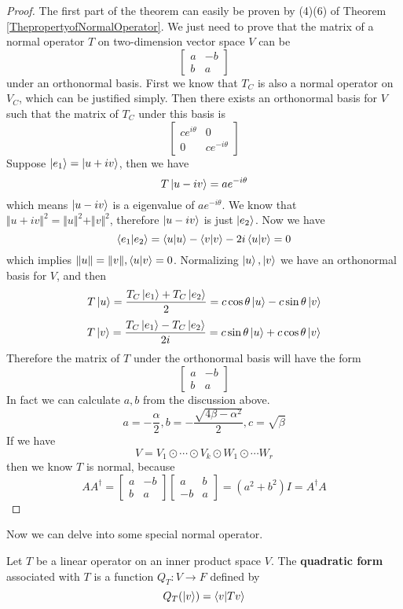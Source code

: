 \documentclass{article}
\begin{document}
\begin{proof}
	The first part of the theorem can easily be proven by (4)(6) of Theorem \ref{ThepropertyofNormalOperator}. We just need to prove that the matrix of a normal operator $T$ on two-dimension vector space $V$ can be
	\[\begin{bmatrix}
		a&-b\\
		b&a
	\end{bmatrix}\]
	under an orthonormal basis. First we know that $T_C$ is also a normal operator on $V_C$, which can be justified simply. Then there exists an orthonormal basis for $V$ such that the matrix of $T_C$ under this basis is
	\[\begin{bmatrix}
		ce^{i\theta}&0\\
		0&ce^{-i\theta}
	\end{bmatrix}\]
	Suppose $\ket{e_1}=\ket{u+iv}$, then we have
	\[T\ket{u-iv}=ae^{-i\theta}\]
	which means $\ket{u-iv}$ is a eigenvalue of $ae^{-i\theta}$. We know that $\Vert u+iv\Vert^2=\Vert u\Vert^2+\Vert v\Vert^2$, therefore $\ket{u-iv}$ is just $\ket{e_2}$. Now we have
	\[\braket{e_1|e_2}=\braket{u|u}-\braket{v|v}-2i\braket{u|v}=0\]
	which implies $\Vert u\Vert=\Vert v\Vert,\braket{u|v}=0$. Normalizing $\ket{u},\ket{v}$ we have an orthonormal basis for $V$, and then
	\[T\ket{u}=\frac{T_C\ket{e_1}+T_C\ket{e_2}}{2}=c\cos\theta\ket{u}-c\sin\theta\ket{v}\]
	\[T\ket{v}=\frac{T_C\ket{e_1}-T_C\ket{e_2}}{2i}=c\sin\theta\ket{u}+c\cos\theta\ket{v}\]
	Therefore the matrix of $T$ under the orthonormal basis will have the form
	\[\begin{bmatrix}
		a&-b\\
		b&a
	\end{bmatrix}\]
	In fact we can calculate $a,b$ from the discussion above.
	\[a=-\frac{\alpha}{2},b=-\frac{\sqrt{4\beta-\alpha^2}}{2},c=\sqrt{\beta}\]
	If we have
	\[V=V_1\odot\cdots\odot V_k\odot W_1\odot\cdots W_r\]
	then we know $T$ is normal, because
	\[AA^\dagger=\begin{bmatrix}
		a&-b\\
		b&a
	\end{bmatrix}\begin{bmatrix}
	a&b\\
	-b&a
	\end{bmatrix}=(a^2+b^2)I=A^\dagger A\]
\end{proof}
Now we can delve into some special normal operator.
\begin{dde}
	Let $T$ be a linear operator on an inner product space $V$. The \textbf{quadratic form} associated with $T$ is a function $Q_T:V\rightarrow F$ defined by
	\[Q_T(\ket{v})=\braket{v|Tv}\]
\end{dde}
\end{document}
